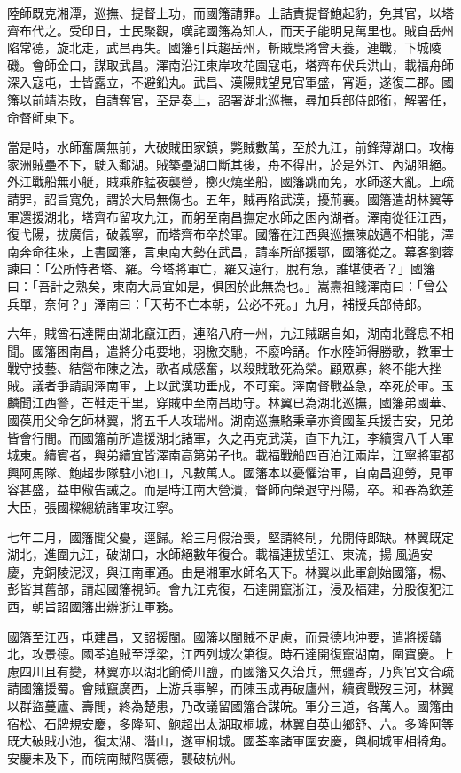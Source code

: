 \begin{pinyinscope}
陸師既克湘潭，巡撫、提督上功，而國籓請罪。上詰責提督鮑起豹，免其官，以塔齊布代之。受印日，士民聚觀，嘆詫國籓為知人，而天子能明見萬里也。賊自岳州陷常德，旋北走，武昌再失。國籓引兵趨岳州，斬賊梟將曾天養，連戰，下城陵磯。會師金口，謀取武昌。澤南沿江東岸攻花園寇屯，塔齊布伏兵洪山，載福舟師深入寇屯，士皆露立，不避鉛丸。武昌、漢陽賊望見官軍盛，宵遁，遂復二郡。國籓以前靖港敗，自請奪官，至是奏上，詔署湖北巡撫，尋加兵部侍郎銜，解署任，命督師東下。

當是時，水師奮厲無前，大破賊田家鎮，斃賊數萬，至於九江，前鋒薄湖口。攻梅家洲賊壘不下，駛入鄱湖。賊築壘湖口斷其後，舟不得出，於是外江、內湖阻絕。外江戰船無小艇，賊乘舴艋夜襲營，擲火燒坐船，國籓跳而免，水師遂大亂。上疏請罪，詔旨寬免，謂於大局無傷也。五年，賊再陷武漢，擾荊襄。國籓遣胡林翼等軍還援湖北，塔齊布留攻九江，而躬至南昌撫定水師之困內湖者。澤南從征江西，復弋陽，拔廣信，破義寧，而塔齊布卒於軍。國籓在江西與巡撫陳啟邁不相能，澤南奔命往來，上書國籓，言東南大勢在武昌，請率所部援鄂，國籓從之。幕客劉蓉諫曰：「公所恃者塔、羅。今塔將軍亡，羅又遠行，脫有急，誰堪使者？」國籓曰：「吾計之熟矣，東南大局宜如是，俱困於此無為也。」嵩燾祖餞澤南曰：「曾公兵單，奈何？」澤南曰：「天茍不亡本朝，公必不死。」九月，補授兵部侍郎。

六年，賊酋石達開由湖北竄江西，連陷八府一州，九江賊踞自如，湖南北聲息不相聞。國籓困南昌，遣將分屯要地，羽檄交馳，不廢吟誦。作水陸師得勝歌，教軍士戰守技藝、結營布陳之法，歌者咸感奮，以殺賊敢死為榮。顧眾寡，終不能大挫賊。議者爭請調澤南軍，上以武漢功垂成，不可棄。澤南督戰益急，卒死於軍。玉麟聞江西警，芒鞋走千里，穿賊中至南昌助守。林翼已為湖北巡撫，國籓弟國華、國葆用父命乞師林翼，將五千人攻瑞州。湖南巡撫駱秉章亦資國荃兵援吉安，兄弟皆會行間。而國籓前所遣援湖北諸軍，久之再克武漢，直下九江，李續賓八千人軍城東。續賓者，與弟續宜皆澤南高第弟子也。載福戰船四百泊江兩岸，江寧將軍都興阿馬隊、鮑超步隊駐小池口，凡數萬人。國籓本以憂懼治軍，自南昌迎勞，見軍容甚盛，益申儆告誡之。而是時江南大營潰，督師向榮退守丹陽，卒。和春為欽差大臣，張國樑總統諸軍攻江寧。

七年二月，國籓聞父憂，逕歸。給三月假治喪，堅請終制，允開侍郎缺。林翼既定湖北，進圍九江，破湖口，水師絕數年復合。載福連拔望江、東流，揚風過安慶，克銅陵泥汊，與江南軍通。由是湘軍水師名天下。林翼以此軍創始國籓，楊、彭皆其舊部，請起國籓視師。會九江克復，石達開竄浙江，浸及福建，分股復犯江西，朝旨詔國籓出辦浙江軍務。

國籓至江西，屯建昌，又詔援閩。國籓以閩賊不足慮，而景德地沖要，遣將援贛北，攻景德。國荃追賊至浮梁，江西列城次第復。時石達開復竄湖南，圍寶慶。上慮四川且有變，林翼亦以湖北餉倚川鹽，而國籓又久治兵，無疆寄，乃與官文合疏請國籓援蜀。會賊竄廣西，上游兵事解，而陳玉成再破廬州，續賓戰歿三河，林翼以群盜蔓廬、壽間，終為楚患，乃改議留國籓合謀皖。軍分三道，各萬人。國籓由宿松、石牌規安慶，多隆阿、鮑超出太湖取桐城，林翼自英山鄉舒、六。多隆阿等既大破賊小池，復太湖、潛山，遂軍桐城。國荃率諸軍圍安慶，與桐城軍相犄角。安慶未及下，而皖南賊陷廣德，襲破杭州。


\end{pinyinscope}
